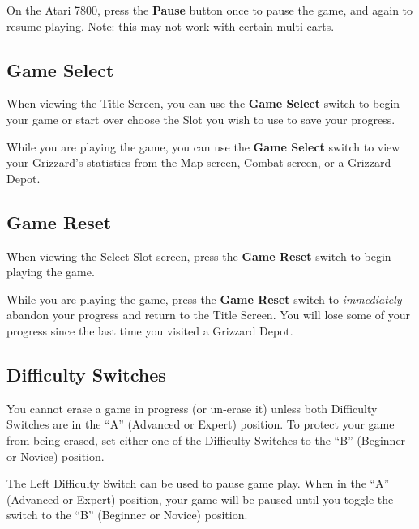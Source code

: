 \documentclass[10pt,twocolumn,openany,article]{memoir}
\begin{document}
On the  Atari 7800, press  the \textbf{Pause}  button once to  pause the
game, and  again to  resume playing.  \ifdefined\ATARIAGESAVE\else Note:
this may not work with certain multi-carts. \fi

\fi

\subsection{Game Select}

When  viewing the  Title Screen,  you can  use the  \textbf{Game Select}
switch to
\ifdefined\NOSAVE
begin your game or start over
\else
choose the Slot you wish to use to save your progress.
\fi

While you  are playing the  game, you  can use the  \textbf{Game Select}
switch to view your Grizzard's  statistics from the Map screen, Combat
screen, or a Grizzard Depot.

\subsection{Game Reset}

When  viewing the  Select  Slot screen,  press  the \textbf{Game  Reset}
switch to begin playing the game.

While you are playing the game,  press the \textbf{Game Reset} switch to
\emph{immediately} abandon your progress and return to the Title Screen.
You will  lose some  of your  progress since the  last time  you visited
a Grizzard Depot.

\subsection{Difficulty Switches}

\ifdefined\NOSAVE\else

You  cannot erase  a  game  in progress  (or  un-erase  it) unless  both
Difficulty  Switches are  in the  ``A'' (Advanced  or Expert)  position.
To protect your game from being erased, set either one of the Difficulty
Switches to the ``B'' (Beginner or Novice) position.

\fi

\ifdefined\TVSECAM

The Left Difficulty Switch  can be used to pause game  play. When in the
``A'' (Advanced or Expert) position, your  game will be paused until you
toggle the switch to the ``B'' (Beginner or Novice) position.

\else
\end{document}
